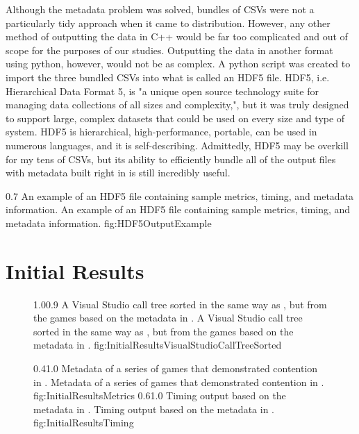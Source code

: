 Although the metadata problem was solved, bundles of CSVs were not a particularly tidy approach when it came to distribution. However, any other method of outputting the data in C++ would be far too complicated and out of scope for the purposes of our studies. Outputting the data in another format using python, however, would not be as complex. A python script was created to import the three bundled CSVs into what is called an HDF5 file. HDF5, i.e. Hierarchical Data Format 5, is "a unique open source technology suite for managing data collections of all sizes and complexity,"\cite{HDFGroupHDF5Introduction}, but it was truly designed to support large, complex datasets that could be used on every size and type of system. HDF5 is hierarchical, high-performance, portable, can be used in numerous languages, and it is self-describing. Admittedly, HDF5 may be overkill for my tens of CSVs, but its ability to efficiently bundle all of the output files with metadata built right in is still incredibly useful.

{0.7}
{An example of an HDF5 file containing sample metrics, timing, and metadata information. }
{An example of an HDF5 file containing sample metrics, timing, and metadata information.}
{fig:HDF5OutputExample}

\section{Initial Results}\label{sec:instr_initial_results}

\begin{figure}
\addtocounter{figure}{-1}
	{1.0}{0.9}
	{A Visual Studio call tree sorted in the same way as , but from the games based on the metadata in .}
	{A Visual Studio call tree sorted in the same way as , but from the games based on the metadata in .}
	{fig:InitialResultsVisualStudioCallTreeSorted}

	{0.4}{1.0}
	{Metadata of a series of games that demonstrated contention in .}
	{Metadata of a series of games that demonstrated contention in .}
	{fig:InitialResultsMetrics}
	{0.6}{1.0}
	{Timing output based on the metadata in .}
	{Timing output based on the metadata in .}
	{fig:InitialResultsTiming}
\end{figure}

